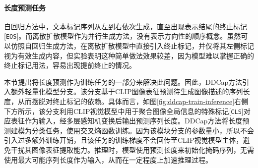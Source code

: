 \paragraph{长度预测任务} 自回归方法中，文本标记序列从左到右依次生成，直至出现表示结尾的终止标记[\texttt{EOS}]。而离散扩散模型作为并行生成方法，没有表示方向性的顺序概念。虽然可以仿照自回归生成方法，在离散扩散模型中直接引入终止标记，并仅将其左侧标记视为有效生成内容，但实验表明这种简单做法效果较差，因为模型难以掌握正确的终止标记用法，容易出现提前终止的情况。

本节提出将长度预测作为训练任务的一部分来解决此问题。因此，DDCap方法引入额外轻量化模型分支。该分支基于CLIP图像表征预测待生成图像描述的序列长度，从而摆脱对终止标记的依赖。具体而言，如图\ref{fig:ddcap-train-inference}右侧下方所示，该分支利用CLIP视觉模型中用于聚合图像全局信息的特殊标记[\texttt{CLS}]对应表征作为输入，经多层感知机变换后输出预测序列长度。DDCap方法将长度预测建模为分类任务，使用交叉熵函数训练。因为该模块分支的参数量小，所以不会引入过多额外训练开销，且该任务的训练梯度不会回传至CLIP视觉模型主体，避免干扰其图像表征提取能力。推理时，模型使用预测长度来初始化掩码序列，无需使用最大可能序列长度作为输入，从而在一定程度上加速推理过程。


